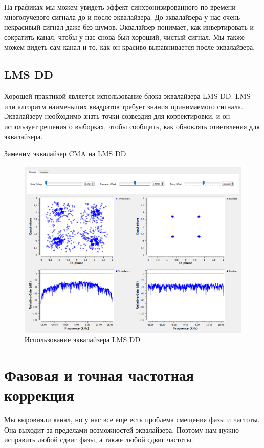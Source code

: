 \documentclass[a4paper, 14pt]{extarticle}
\begin{document}
    На графиках мы можем увидеть эффект синхронизированного по времени многолучевого сигнала до и после эквалайзера.
    До эквалайзера у нас очень некрасивый сигнал даже без шумов.
    Эквалайзер понимает, как инвертировать и сократить канал, чтобы у нас снова был хороший, чистый сигнал.
    Мы также можем видеть сам канал и то, как он красиво выравнивается после эквалайзера.

    \subsection{LMS DD}

    Хорошей практикой является использование блока эквалайзера LMS DD.
    LMS или алгоритм наименьших квадратов требует знания принимаемого сигнала.
    Эквалайзеру необходимо знать точки созвездия для корректировки, и он использует решения о выборках, чтобы сообщить, как обновлять ответвления для эквалайзера.

    Заменим эквалайзер CMA на LMS DD.

    \begin{figure}[H]
        \centering
        \includegraphics[width=0.8\linewidth]{eq_lms_dd}
        \caption{Использование эквалайзера LMS DD}
        \label{fig:eq_lms_dd}
    \end{figure}

    \newpage


    \section{Фазовая и точная частотная коррекция}
    \label{sec:6}

    Мы выровняли канал, но у нас все еще есть проблема смещения фазы и частоты.
    Она выходит за пределами возможностей эквалайзера.
    Поэтому нам нужно исправить любой сдвиг фазы, а также любой сдвиг частоты.
\end{document}
